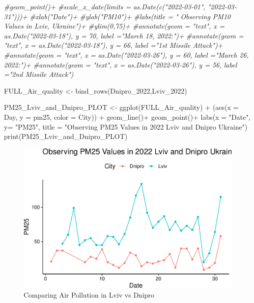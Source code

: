 \documentclass[
  12pt,
]{article}
\newenvironment{Shaded}{\begin{snugshade}}{\end{snugshade}}
\newcommand{\AttributeTok}[1]{\textcolor[rgb]{0.77,0.63,0.00}{#1}}
\newcommand{\CommentTok}[1]{\textcolor[rgb]{0.56,0.35,0.01}{\textit{#1}}}
\newcommand{\FunctionTok}[1]{\textcolor[rgb]{0.00,0.00,0.00}{#1}}
\newcommand{\NormalTok}[1]{#1}
\newcommand{\OtherTok}[1]{\textcolor[rgb]{0.56,0.35,0.01}{#1}}
\newcommand{\SpecialCharTok}[1]{\textcolor[rgb]{0.00,0.00,0.00}{#1}}
\newcommand{\StringTok}[1]{\textcolor[rgb]{0.31,0.60,0.02}{#1}}
\begin{document}
\begin{Shaded}
\begin{Highlighting}[]
  \CommentTok{\#geom\_point()+}
  \CommentTok{\#scale\_x\_date(limits = as.Date(c("2022{-}03{-}01", "2022{-}03{-}31")))+ }
  \CommentTok{\#xlab("Date")+ }
  \CommentTok{\#ylab("PM10")+ }
  \CommentTok{\#labs(title = "        Observing PM10 Values in Lviv, Ukraine")+}
  \CommentTok{\#ylim(0,75)+}
  \CommentTok{\#annotate(geom = "text", x = as.Date("2022{-}03{-}18"), y = 70, label ="March 18, 2022:")+ }
  \CommentTok{\#annotate(geom = "text", x = as.Date("2022{-}03{-}18"), y = 66, label ="1st Missile Attack")+ }
  \CommentTok{\#annotate(geom = "text", x = as.Date("2022{-}03{-}26"), y = 60, label ="March 26, 2022:")+ }
  \CommentTok{\#annotate(geom = "text", x = as.Date("2022{-}03{-}26"), y = 56, label ="2nd Missile Attack")}
\end{Highlighting}
\end{Shaded}

\begin{Shaded}
\begin{Highlighting}[]
\NormalTok{FULL\_Air\_quality }\OtherTok{\textless{}{-}} \FunctionTok{bind\_rows}\NormalTok{(Dnipro\_2022,Lviv\_2022)}

\NormalTok{PM25\_Lviv\_and\_Dnipro\_PLOT }\OtherTok{\textless{}{-}}
  \FunctionTok{ggplot}\NormalTok{(FULL\_Air\_quality) }\SpecialCharTok{+} 
\NormalTok{(}\FunctionTok{aes}\NormalTok{(}\AttributeTok{x =}\NormalTok{ Day, }\AttributeTok{y =}\NormalTok{ pm25, }\AttributeTok{color =}\NormalTok{ City)) }\SpecialCharTok{+} 
              \FunctionTok{geom\_line}\NormalTok{()}\SpecialCharTok{+}  
  \FunctionTok{geom\_point}\NormalTok{()}\SpecialCharTok{+}
  \FunctionTok{labs}\NormalTok{(}\AttributeTok{x =} \StringTok{"Date"}\NormalTok{, }\AttributeTok{y=} \StringTok{"PM25"}\NormalTok{,}
       \AttributeTok{title =} \StringTok{"Observing PM25 Values in 2022 Lviv and Dnipro Ukraine"}\NormalTok{)  }
\FunctionTok{print}\NormalTok{(PM25\_Lviv\_and\_Dnipro\_PLOT)}
\end{Highlighting}
\end{Shaded}

\begin{figure}
\centering
\includegraphics{Fontanie_Gordon_Weinberg_Project_files/figure-latex/Plotting Lviv vs Dnipro-1.pdf}
\caption{Comparing Air Pollution in Lviv vs Dnipro}
\end{figure}
\end{document}
